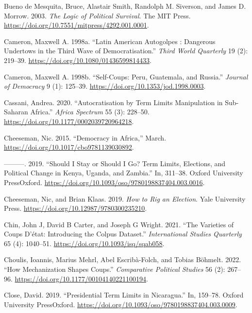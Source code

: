 \documentclass[
  12pt,
]{report}
\newlength{\cslhangindent}
\newenvironment{CSLReferences}[2] %
 {\begin{list}{}{%
  \setlength{\itemindent}{0pt}
  \setlength{\leftmargin}{0pt}
  \setlength{\parsep}{0pt}
  \ifodd #1
   \setlength{\leftmargin}{\cslhangindent}
   \setlength{\itemindent}{-1\cslhangindent}
  \fi
  \setlength{\itemsep}{#2\baselineskip}}}
 {\end{list}}
\begin{document}
\begin{CSLReferences}{1}{0}
Bueno de Mesquita, Bruce, Alastair Smith, Randolph M. Siverson, and
James D. Morrow. 2003. \emph{The Logic of Political Survival}. The MIT
Press. \url{https://doi.org/10.7551/mitpress/4292.001.0001}.

Cameron, Maxwell A. 1998a. {``Latin American Autogolpes : Dangerous
Undertows in the Third Wave of Democratisation.''} \emph{Third World
Quarterly} 19 (2): 219--39.
\url{https://doi.org/10.1080/01436599814433}.

Cameron, Maxwell A. 1998b. {``Self-Coups: Peru, Guatemala, and
Russia.''} \emph{Journal of Democracy} 9 (1): 125--39.
\url{https://doi.org/10.1353/jod.1998.0003}.

Cassani, Andrea. 2020. {``Autocratisation by Term Limits Manipulation in
Sub-Saharan Africa.''} \emph{Africa Spectrum} 55 (3): 228--50.
\url{https://doi.org/10.1177/0002039720964218}.

Cheeseman, Nic. 2015. {``Democracy in Africa,''} March.
\url{https://doi.org/10.1017/cbo9781139030892}.

---------. 2019. {``Should I Stay or Should I Go? Term Limits,
Elections, and Political Change in Kenya, Uganda, and Zambia.''} In,
311--38. Oxford University PressOxford.
\url{https://doi.org/10.1093/oso/9780198837404.003.0016}.

Cheeseman, Nic, and Brian Klaas. 2019. \emph{How to Rig an Election}.
Yale University Press. \url{https://doi.org/10.12987/9780300235210}.

Chin, John J, David B Carter, and Joseph G Wright. 2021. {``The
Varieties of Coups D{'}état: Introducing the Colpus Dataset.''}
\emph{International Studies Quarterly} 65 (4): 1040--51.
\url{https://doi.org/10.1093/isq/sqab058}.

Choulis, Ioannis, Marius Mehrl, Abel Escribà-Folch, and Tobias Böhmelt.
2022. {``How Mechanization Shapes Coups.''} \emph{Comparative Political
Studies} 56 (2): 267--96.
\url{https://doi.org/10.1177/00104140221100194}.

Close, David. 2019. {``Presidential Term Limits in Nicaragua.''} In,
159--78. Oxford University PressOxford.
\url{https://doi.org/10.1093/oso/9780198837404.003.0009}.


\end{CSLReferences}
\end{document}
